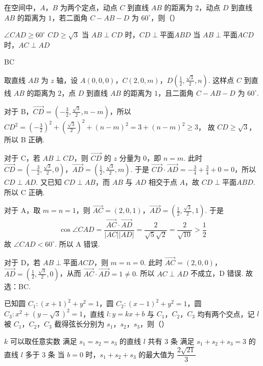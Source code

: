 \documentclass[UTF8,a4paper,oneside,11pt]{ctexbook}
\begin{document}
\begin{problem}
在空间中，\(A\)，\(B\) 为两个定点，动点 \(C\) 到直线 \(AB\) 的距离为 \(2\)，动点 \(D\) 到直线 \(AB\) 的距离为 \(1\)，若二面角 \(C-AB-D\) 为 \(60^\circ\)，则（\quad）

\choices
    {\(\angle CAD\ge 60^\circ\)}
    {\(CD\ge \sqrt{3}\)}
    {当 \(AB\perp CD\) 时，\(CD\perp \text{平面} ABD\)}
    {当 \(AB\perp \text{平面} ACD\) 时，\(AC\perp AD\)}
\end{problem}

\begin{answer}
BC
\end{answer}

\begin{solution}
取直线 \(AB\) 为 \(z\) 轴，设 \(A(0,0,0)\)，\(C(2,0,m)\)，\(D\left( \frac{1}{2},\frac{\sqrt{3}}{2},n \right)\). 这样点 \(C\) 到直线 \(AB\) 的距离为 \(2\)，点 \(D\) 到直线 \(AB\) 的距离为 \(1\)，且二面角 \(C-AB-D\) 为 \(60^\circ\).

对于 B，\(\overrightarrow{CD}=\left( -\frac{3}{2},\frac{\sqrt{3}}{2},n-m \right)\)，所以
\(
CD^2=\left( -\frac{3}{2} \right)^2+\left( \frac{\sqrt{3}}{2} \right)^2+\left( n-m \right)^2=3+\left( n-m \right)^2\ge 3
\)，
故 \(CD\ge \sqrt{3}\)，所以 B 正确.

对于 C，若 \(AB\perp CD\)，则 \(\overrightarrow{CD}\) 的 \(z\) 分量为 \(0\)，即 \(n=m\). 此时 \(\overrightarrow{CD}=\left( -\frac{3}{2},\frac{\sqrt{3}}{2},0 \right)\)，\(\overrightarrow{AD}=\left( \frac{1}{2},\frac{\sqrt{3}}{2},m \right)\). 于是 \(\overrightarrow{CD}\cdot \overrightarrow{AD}=-\frac{3}{4}+\frac{3}{4}+0=0\)，所以 \(CD\perp AD\). 又已知 \(CD\perp AB\)，而 \(AB\) 与 \(AD\) 相交于点 \(A\)，故 \(CD\perp \text{平面} ABD\).
所以 C 正确.

对于 A，取 \(m=n=1\)，则 \(\overrightarrow{AC}=(2,0,1)\)，\(\overrightarrow{AD}=\left( \frac{1}{2},\frac{\sqrt{3}}{2},1 \right)\). 于是
\[
\cos \angle CAD=\frac{\overrightarrow{AC}\cdot \overrightarrow{AD}}{\lvert AC\rvert \lvert AD\rvert}=\frac{2}{\sqrt{5}\sqrt{2}}=\frac{2}{\sqrt{10}}>\frac{1}{2}
\]
故 \(\angle CAD<60^\circ\). 所以 A 错误.

对于 D，若 \(AB\perp \text{平面} ACD\)，则 \(m=n=0\). 此时 \(\overrightarrow{AC}=(2,0,0)\)，\(\overrightarrow{AD}=\left( \frac{1}{2},\frac{\sqrt{3}}{2},0 \right)\)，从而 \(\overrightarrow{AC}\cdot \overrightarrow{AD}=1\ne 0\).
所以 \(AC\perp AD\) 不成立，D 错误.
故选：BC.
\end{solution}

\begin{problem}
已知圆 \(C_1:(x+1)^2+y^2=1\)，圆 \(C_2:(x-1)^2+y^2=1\)，圆 \(C_3:x^2+\left( y-\sqrt{3} \right)^2=1\)，直线 \(l:y=kx+b\) 与 \(C_1\)，\(C_2\)，\(C_3\) 均有两个交点，记 \(l\) 被 \(C_1\)，\(C_2\)，\(C_3\) 截得弦长分别为 \(s_1\)，\(s_2\)，\(s_3\)，则（\quad）

\choices
    {\(k\) 可以取任意实数}
    {满足 \(s_1=s_2=s_3\) 的直线 \(l\) 共有 \(3\) 条}
    {满足 \(s_1+s_2+s_3=3\) 的直线 \(l\) 多于 \(3\) 条}
    {当 \(b=0\) 时，\(s_1+s_2+s_3\) 的最大值为 \(\dfrac{2\sqrt{21}}{3}\)}
\end{problem}
\end{document}
